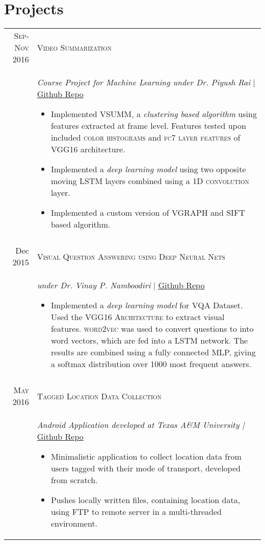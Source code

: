 \documentclass[a4paper,10pt]{article}
\begin{document}
\section{Projects}
\centering
\begin{longtable}{r|p{12cm}}
\textsc{Sep-Nov 2016} & \large \textsc{Video Summarization}\\
& \textit{Course Project for Machine Learning under Dr. Piyush Rai } | \href{http://github.com/architsharma97/VideoSummarization/}{Github Repo}
\begin{itemize}
\item Implemented VSUMM, a \textit{clustering based algorithm} using features extracted at frame level. Features tested upon included \textsc{color histograms} and \textsc{fc7 layer features} of \textsc{VGG16} architecture.
\item Implemented a \textit{deep learning model} using two opposite moving \textsc{LSTM} layers combined using a \textsc{1D convolution} layer.
\item Implemented a custom version of VGRAPH and SIFT based algorithm.\vspace*{-\baselineskip}
\end{itemize}\\
\multicolumn{2}{c}{}\\
Dec 2015 & \large \textsc{Visual Question Answering using Deep Neural Nets}\\
& \textit{under Dr. Vinay P. Namboodiri } | \href{https://github.com/architsharma97/VisualQA}{Github Repo}
\begin{itemize}
\item Implemented a \textit{deep learning model} for VQA Dataset. Used the \textsc{VGG16 Architecture} to extract visual features. \textsc{word2vec} was used to convert questions to into word vectors, which are fed into a LSTM network. The results are combined using a fully connected MLP, giving a softmax distribution over 1000 most frequent answers.\vspace*{-\baselineskip}
\end{itemize}\\
\multicolumn{2}{c}{}\\
\textsc{May 2016} & \large \textsc{Tagged Location Data Collection}\\
& \textit{Android Application developed at Texas A\&M University | } \href{https://github.com/architsharma97/LocationTagger}{Github Repo}
\begin{itemize}
\item Minimalistic application to collect location data from users tagged with their mode of transport, developed from scratch.
\item Pushes locally written files, containing location data, using FTP to remote server in a multi-threaded environment.\vspace*{-\baselineskip}
\end{itemize}\\
\end{longtable}
\end{document}
